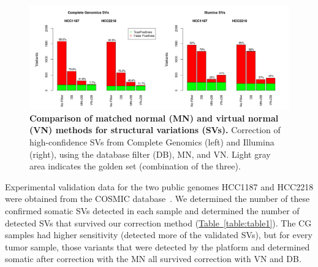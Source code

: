 \begin{figure}[t!]
\centering
\includegraphics[width=\textwidth]{chapters/images/virtualnormal/Hiltemann_Figure1.png}
\caption{\textbf{Comparison of matched normal (MN) and virtual normal (VN) methods for structural variations (SVs).} Correction of high-confidence SVs from Complete Genomics (left) and Illumina (right), using the database filter (DB), MN, and VN\@. Light gray area indicates the golden set (combination of the three).}
\label{fig:svcomparison}
\end{figure}

Experimental validation data for the two public genomes HCC1187 and HCC2218 were obtained from the COSMIC database~\cite{forbes2010cosmic,bindal2011cosmic}. We determined the number of these confirmed somatic SVs detected in each sample and determined the number of detected SVs that survived our correction method (\hyperref[table:table1]{Table~\ref{table:table1}}). The CG samples had higher sensitivity (detected more of the validated SVs), but for every tumor sample, those variants that were detected by the platform and determined somatic after correction with the MN all survived correction with VN and DB.

